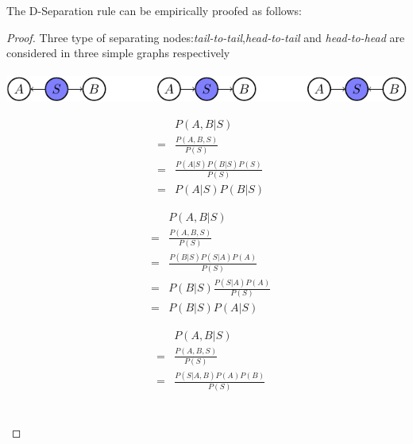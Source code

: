The D-Separation rule can be empirically proofed as follows:
\begin{proof}
	Three type of separating nodes:\emph{tail-to-tail},\emph{head-to-tail} and \emph{head-to-head} are considered in three simple graphs respectively   \\ \\
	\includegraphics[width=\textwidth]{./Figures/D_Sep}\newline
\begin{minipage}[c]{0.32\textwidth}
 \begin{equation*}
  \begin{array}{rcl}
   & & P(A,B|S)\\
   &=& \frac{P(A,B,S)}{P(S)}\\
   &=& \frac{P(A|S)P(B|S)P(S)}{P(S)}\\
   &=& P(A|S)P(B|S)
  \end{array}
 \end{equation*}
\end{minipage}
\begin{minipage}[c]{0.32\textwidth}
 \begin{equation*}
  \begin{array}{rcl}
   & & P(A,B|S)\\
   &=& \frac{P(A,B,S)}{P(S)}\\
   &=& \frac{P(B|S)P(S|A)P(A)}{P(S)}\\
   &=& P(B|S)\frac{P(S|A)P(A)}{P(S)}\\
   &=& P(B|S)P(A|S)
  \end{array}
 \end{equation*}
\end{minipage}
\begin{minipage}[c]{0.32\textwidth}
 \begin{equation*}
  \begin{array}{rcl}
   & & P(A,B|S)\\
   &=& \frac{P(A,B,S)}{P(S)}\\
   &=& \frac{P(S|A,B)P(A)P(B)}{P(S)}\\
  \end{array}
 \end{equation*}
\end{minipage}\\
\end{proof}



